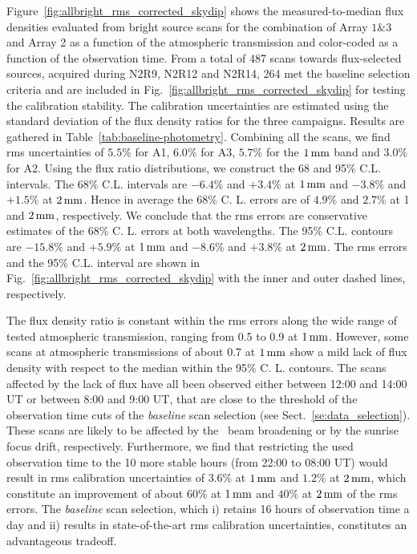 Figure~\ref{fig:allbright_rms_corrected_skydip} shows the
measured-to-median flux densities evaluated from bright source scans
for the combination of Array $1\&3$ and Array 2 as a function of the
atmospheric transmission and color-coded as a function of the
observation time. From a total of 487 scans towards
flux-selected sources, acquired during N2R9, N2R12 and N2R14, 264 met
the baseline selection criteria and are included in
Fig.~\ref{fig:allbright_rms_corrected_skydip} for testing the
calibration stability. The calibration uncertainties are
estimated using the standard deviation of the flux density ratios for
the three campaigns. Results are gathered in
Table~\ref{tab:baseline-photometry}.
Combining all the scans, we find rms uncertainties of $5.5\%$ for A1,
$6.0\%$ for A3, $5.7\%$ for the $1\,\rm{mm}$ band and $3.0\%$ for A2.
{\lp Using the flux ratio distributions, we construct the 68 and 95\%
C.L. intervals. The 68\% C.L. intervals are $-6.4\%$ and $+3.4\%$ at
$1\,\rm{mm}$ and $-3.8\%$ and $+1.5\%$ at $2\, \rm{mm}$. Hence in average
the 68\% C. L. errors are of $4.9\%$ and $2.7\%$ at 1 and $2\, \rm{mm}$,
respectively. We conclude that the rms errors are conservative
estimates of the 68\% C. L. errors at both wavelengths. The 95\%
C.L. contours are $-15.8\%$ and $+5.9\%$ at $1\,\rm{mm}$ and $-8.6\%$ and
$+3.8\%$ at $2\, \rm{mm}$.
The rms errors and the 95\%
C.L. interval are shown in
Fig.~\ref{fig:allbright_rms_corrected_skydip} with the inner and
outer dashed lines, respectively.} 


The flux density ratio is constant within the rms errors along the
wide range of tested atmospheric transmission, ranging from 0.5 to 0.9
at $1\,\rm{mm}$.
However, some scans at atmospheric transmissions of about 0.7 at
$1\,\rm{mm}$ show a mild lack of flux density with respect to the
median within the 95\% C. L. contours. The scans
affected by the lack of flux have all been observed
either between 12:00 and 14:00 UT or between 8:00 and 9:00 UT,
that are close to the threshold of the observation time cuts of
the \emph{baseline} scan selection (see
Sect.~\ref{se:data_selection}). These scans are likely
to be affected by the \afternoon\ beam broadening or by the
sunrise focus drift, respectively. Furthermore, we find that restricting the
used observation time to the 10 more stable hours (from 22:00 to
08:00 UT) would result in rms calibration uncertainties of
$3.6\%$ at $1\,\rm{mm}$ and $1.2\%$ at $2\,\rm{mm}$, which constitute an
improvement of about $60\%$ at $1\,\rm{mm}$ and $40\%$ at $2\,\rm{mm}$
of the rms errors.  
The \emph{baseline} scan selection, which i)
retains 16 hours of observation time
a day and ii) %
{\lp results in state-of-the-art rms calibration
uncertainties,} constitutes an advantageous tradeoff.

